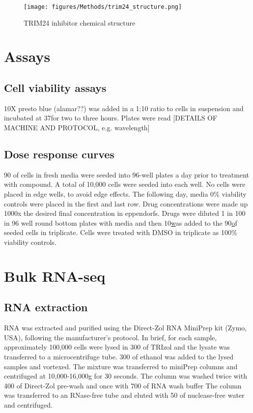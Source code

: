 \begin{figure}[htb]
\centering
\texttt{[image: figures/Methods/trim24\_structure.png]}
\caption[TRIM24i structure]{TRIM24 inhibitor chemical structure}
\label{fig:trim24_structure}
\end{figure}

\section{Assays}
\subsection{Cell viability assays}
10X presto blue (alamar??) was added in a 1:10 ratio to cells in suspension and incubated at 37\C for two to three hours.
Plates were read [DETAILS OF MACHINE AND PROTOCOL, e.g. wavelength]

\subsection{Dose response curves}
90\ul{} of cells in fresh media were seeded into 96-well plates a day prior to treatment with compound.
A total of 10,000 cells were seeded into each well.
No cells were placed in edge wells, to avoid edge effects.
The following day, media 0\% viability controls were placed in the first and last row.
Drug concentrations were made up 1000x the desired final concentration in eppendorfs.
Drugs were diluted 1 in 100 in 96 well round bottom plates with media and then 10\ul was added to the 90\ul of seeded cells in triplicate.
Cells were treated with DMSO in triplicate as 100\% viability controls.

\section{Bulk RNA-seq}
\subsection{RNA extraction}
RNA was extracted and purified using the Direct-Zol RNA MiniPrep kit (Zymo, USA), following the manufacturer's protocol.
In brief, for each sample, approximately 100,000 cells were lysed in 300\ul{} of TRIzol and the lysate was transferred to a microcentrifuge tube.
300\ul{} of ethanol was added to the lysed samples and vortexed.
The mixture was transferred to miniPrep columns and centrifuged at 10,000-16,000g for 30 seconds.
The column was washed twice with 400\ul{} of Direct-Zol pre-wash and once with 700\ul{} of RNA wash buffer
The column was transferred to an RNase-free tube and eluted with 50\ul{} of nuclease-free water and centrifuged.

